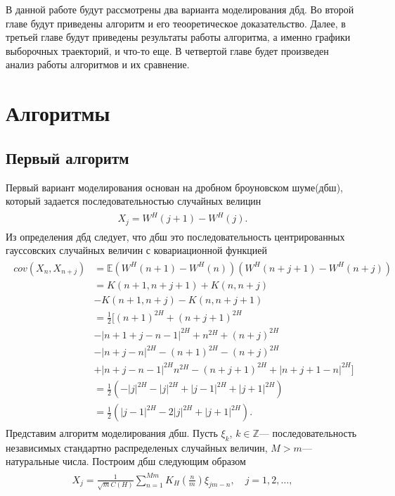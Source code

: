 \documentclass[a4paper,12pt]{article}
\numberwithin{equation}{section}
\newcommand{\Z}{\mathbb Z}
\newcommand{\W}{W^H}
\begin{document}
	В данной работе будут рассмотрены два варианта моделирования дбд. Во второй главе будут приведены алгоритм и его теооретическое доказательство. Далее, в третьей главе будут приведены результаты работы алгоритма, а именно графики выборочных траекторий, и что-то еще. В четвертой главе будет произведен анализ работы алгоритмов и их сравнение.  
	\section{Алгоритмы}
	\subsection{Первый алгоритм}
	Первый вариант моделирования основан на дробном броуновском шуме(дбш), который задается последовательностью случайных велицин
	\begin{align}
	\begin{split}
	X_j = \W(j+1)-\W(j).
	\end{split}
	\end{align}
	Из определения дбд следует, что дбш это последовательность центрированных гауссовских случайных величин с ковариационной функцией 
	\begin{align}
	\begin{split}
	cov(X_n, X_{n+j}) &= \mathbb{E}(\W(n+1)-\W(n))(\W(n+j+1)-\W(n+j))\\ &= K(n+1, n+j+1) +K(n, n+j) \\ &- K(n+1, n+j)- K(n, n+j+1) \\ &= \frac{1}{2} \biggr[(n+1)^{2H} + (n+j+1)^{2H} \\ &-|n+1+j-n-1|^{2H} + n^{2H} + (n+j)^{2H} \\ &- |n+j-n|^{2H} - (n+1)^{2H} - (n+j)^{2H} \\ &+ |n+j-n-1|^{2H} n^{2H}-(n+j+1)^{2H} + |n+j+1-n|^{2H}  \biggr] \\ &= \frac{1}{2}\left(-|j|^{2H}-|j|^{2H}+|j-1|^{2H}+|j+1|^{2H} \right)  \\ &= \frac{1}{2}\left(|j-1|^{2H}- 2|j|^{2H}+|j+1|^{2H} \right).
	\end{split}
	\end{align}
	Представим алгоритм моделирования дбш. Пусть $\xi_k$, $k \in \Z$--- последовательность независимых стандартно распределеных случайных величин, $M>m$--- натуральные числа. Построим дбш следующим образом
	\begin{align}
	\begin{split}
	X_j = \frac{1}{\sqrt{m}C(H)}\sum_{n=1}^{Mm}K_H\left(\frac{n}{m}\right) \xi_{jm-n}, \quad j = 1,2,\ldots, 
	\end{split}
	\end{align}
\end{document}
